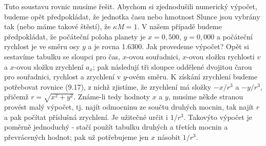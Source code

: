     Tuto soustavu rovnic musíme řešit. Abychom si zjednodušili numerický výpočet, budeme opět 
    předpokládat, že jednotka času nebo hmotnost Slunce jsou vybrány tak (nebo máme takové štěstí), 
    že \(\kappa M = 1\). V našem případě budeme předpokládat, že počáteční poloha planety je \(x= 
    0,500\), \(y = 0,000\) a počáteční rychlost je ve směru osy \(y\) a je rovna \num{1.6300}. Jak 
    provedeme výpočet? Opět si sestavíme tabulku se sloupci pro čas, \(x\)-ovou souřadnici, 
    \(x\)-ovou složku rychlosti \(v\) a \(x\)-ovou složku zrychlení \(a_x\); pak následují tři 
    sloupce oddělené dvojitou čarou pro souřadnici, rychlost a zrychlení v \(y\)-ovém směru. K 
    získání zrychlení budeme potřebovat rovnice (9.17), z nichž zjistíme, že zrychlení má složky 
    \(-x/r^3\) a \(-y/r^3\), přičemž \(r=\sqrt{x^2 + y^2}\). Známe-li tedy hodnoty \(x\) a \(y\), 
    musíme někde stranou provést malý výpočet, tj. najít odmocninu ze součtu druhých mocnin, tak 
    najít \(r\) a pak počítat příslušná zrychlení. Je užitečné určit i \(1/r^3\). Takovýto výpočet 
    je poměrně jednoduchý - stačí použít tabulku druhých a třetích mocnin a převrácených hodnot; 
    pak už potřebujeme jen \(x\) násobit \(1/r^3\).
    

